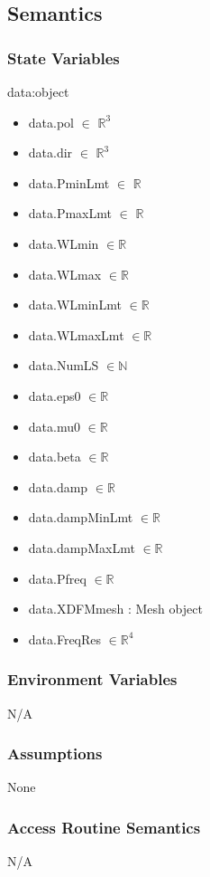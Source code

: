 \documentclass[12pt, titlepage]{article}
\begin{document}
	\subsection{Semantics}
	
	\subsubsection{State Variables}
	
	data:object \begin{itemize} \item data.pol $\in$ $\mathbb{R}^3$ \item data.dir
		$\in$ $\mathbb{R}^3$ \item data.PminLmt $\in$ $\mathbb{R}$ \item data.PmaxLmt
		$\in$ $\mathbb{R}$ \item data.WLmin $\in \mathbb{R}$ \item data.WLmax $\in
		\mathbb{R}$ \item data.WLminLmt $\in \mathbb{R}$ \item data.WLmaxLmt $\in
		\mathbb{R}$ \item data.NumLS $\in \mathbb{N}$ \item data.eps0 $\in \mathbb{R}$
		\item data.mu0  $\in \mathbb{R}$ \item data.beta $\in \mathbb{R}$ \item
		data.damp $\in \mathbb{R}$ \item data.dampMinLmt $\in \mathbb{R}$ \item
		data.dampMaxLmt $\in \mathbb{R}$ \item data.Pfreq $\in \mathbb{R}$ \item
		data.XDFMmesh : Mesh object \item data.FreqRes $\in \mathbb{R}^4$
		
		
	\end{itemize}
	
	\subsubsection{Environment Variables}
	
	N/A \subsubsection{Assumptions}
	
	None
	
	\subsubsection{Access Routine Semantics} N/A
	
\end{document}
